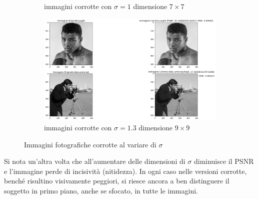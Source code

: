 \begin{figure}[H]
\begin{subfigure}{0.67\textwidth}
        \caption{immagini corrotte con $\sigma = 1$ dimensione $7 \times 7$}
        \label{fig:fotogrCorrotte7x7}
    \end{subfigure}
    \begin{subfigure}{0.67\textwidth}
        \centering
        \includegraphics[width=\textwidth]{confrontiPuntoUno/9-1.3-0.02.png}
        \caption{immagini corrotte con $\sigma = 1.3$ dimensione $9 \times 9$}
        \label{fig:fotogrCorrotte9x9}
    \end{subfigure}
    \caption{Immagini fotografiche corrotte al variare di $\sigma$}
    \label{fig:fotogrCorrotte}
\end{figure}

Si nota un'altra volta che all'aumentare delle dimensioni di $\sigma$ diminuisce il PSNR e l'immagine perde di 
incisività (nitidezza).
In ogni caso nelle versioni corrotte, benché risultino visivamente peggiori, si riesce ancora a ben distinguere il 
soggetto in primo piano, anche se sfocato, in tutte le immagini. 
